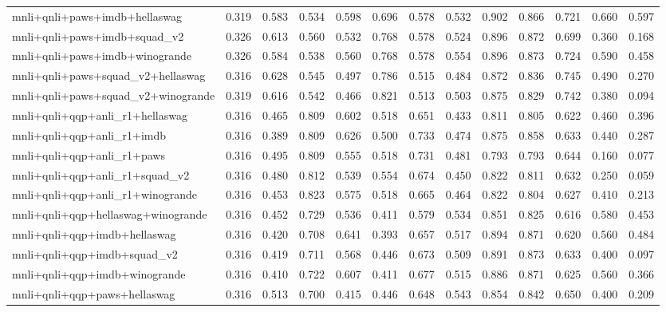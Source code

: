 \begin{table}[t]
\begin{tabular}{lrrrrrrrrrrrr}
    mnli+qnli+paws+imdb+hellaswag & 0.319 & 0.583 & 0.534 & 0.598 & 0.696 & 0.578 & 0.532 & 0.902 & 0.866 & 0.721 & 0.660 & 0.597 \\
    mnli+qnli+paws+imdb+squad\_v2 & 0.326 & 0.613 & 0.560 & 0.532 & 0.768 & 0.578 & 0.524 & 0.896 & 0.872 & 0.699 & 0.360 & 0.168 \\
    mnli+qnli+paws+imdb+winogrande & 0.326 & 0.584 & 0.538 & 0.560 & 0.768 & 0.578 & 0.554 & 0.896 & 0.873 & 0.724 & 0.590 & 0.458 \\
    mnli+qnli+paws+squad\_v2+hellaswag & 0.316 & 0.628 & 0.545 & 0.497 & 0.786 & 0.515 & 0.484 & 0.872 & 0.836 & 0.745 & 0.490 & 0.270 \\
    mnli+qnli+paws+squad\_v2+winogrande & 0.319 & 0.616 & 0.542 & 0.466 & 0.821 & 0.513 & 0.503 & 0.875 & 0.829 & 0.742 & 0.380 & 0.094 \\
    mnli+qnli+qqp+anli\_r1+hellaswag & 0.316 & 0.465 & 0.809 & 0.602 & 0.518 & 0.651 & 0.433 & 0.811 & 0.805 & 0.622 & 0.460 & 0.396 \\
    mnli+qnli+qqp+anli\_r1+imdb & 0.316 & 0.389 & 0.809 & 0.626 & 0.500 & 0.733 & 0.474 & 0.875 & 0.858 & 0.633 & 0.440 & 0.287 \\
    mnli+qnli+qqp+anli\_r1+paws & 0.316 & 0.495 & 0.809 & 0.555 & 0.518 & 0.731 & 0.481 & 0.793 & 0.793 & 0.644 & 0.160 & 0.077 \\
    mnli+qnli+qqp+anli\_r1+squad\_v2 & 0.316 & 0.480 & 0.812 & 0.539 & 0.554 & 0.674 & 0.450 & 0.822 & 0.811 & 0.632 & 0.250 & 0.059 \\
    mnli+qnli+qqp+anli\_r1+winogrande & 0.316 & 0.453 & 0.823 & 0.575 & 0.518 & 0.665 & 0.464 & 0.822 & 0.804 & 0.627 & 0.410 & 0.213 \\
    mnli+qnli+qqp+hellaswag+winogrande & 0.316 & 0.452 & 0.729 & 0.536 & 0.411 & 0.579 & 0.534 & 0.851 & 0.825 & 0.616 & 0.580 & 0.453 \\
    mnli+qnli+qqp+imdb+hellaswag & 0.316 & 0.420 & 0.708 & 0.641 & 0.393 & 0.657 & 0.517 & 0.894 & 0.871 & 0.620 & 0.560 & 0.484 \\
    mnli+qnli+qqp+imdb+squad\_v2 & 0.316 & 0.419 & 0.711 & 0.568 & 0.446 & 0.673 & 0.509 & 0.891 & 0.873 & 0.633 & 0.400 & 0.097 \\
    mnli+qnli+qqp+imdb+winogrande & 0.316 & 0.410 & 0.722 & 0.607 & 0.411 & 0.677 & 0.515 & 0.886 & 0.871 & 0.625 & 0.560 & 0.366 \\
    mnli+qnli+qqp+paws+hellaswag & 0.316 & 0.513 & 0.700 & 0.415 & 0.446 & 0.648 & 0.543 & 0.854 & 0.842 & 0.650 & 0.400 & 0.209 \\

\end{tabular}
\end{table}
